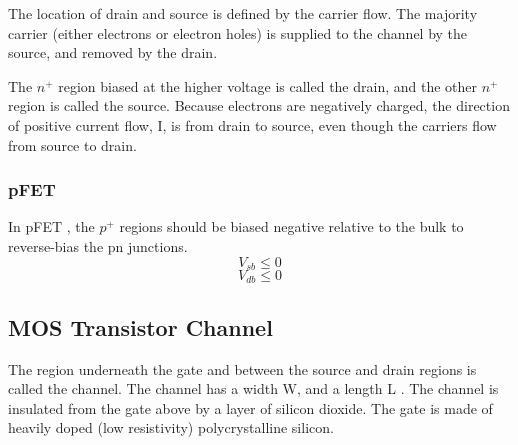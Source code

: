 \documentclass[main]{subfiles}
\begin{document}
The location of drain and source is defined by the carrier flow\cite{book:VLSI}.
The majority carrier (either electrons or electron holes) is supplied to the channel by the source, and removed by the drain.

The $n^+$ region biased at the higher voltage is called the drain, and the other $n^+$ region is called the source. Because electrons are negatively charged, the direction of positive current flow, I, is from drain to source, even though the carriers flow from source to drain. \cite{book:VLSI}

\subsubsection{pFET}
In pFET , the $p^+$ regions should be biased negative relative to the bulk to reverse-bias the pn junctions.
\begin{equation}
V_{sb} \leq 0
\end{equation}
\begin{equation}
V_{db} \leq 0
\end{equation}

\subsection{MOS Transistor Channel}
The region underneath the gate and between the source and drain regions is called the channel. The channel has a width W, and a length L
. The channel is insulated from the gate above by a layer of silicon dioxide. The gate is made of heavily doped (low resistivity) polycrystalline silicon.
\cite{book:VLSI}
\end{document}

